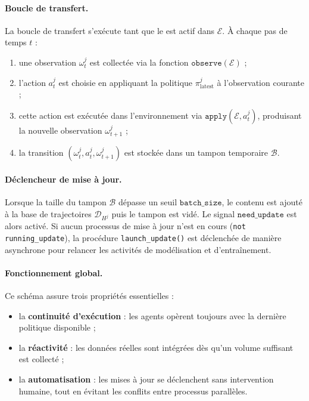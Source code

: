 \paragraph{Boucle de transfert.}
La boucle de transfert s'exécute tant que le  est actif dans $\mathcal{E}$.
À chaque pas de temps $t$ :
\begin{enumerate}
  \item une observation $\omega^j_t$ est collectée via la fonction $\texttt{observe}(\mathcal{E})$ ;
  \item l'action $a^j_t$ est choisie en appliquant la politique $\pi^j_{\text{latest}}$ à l'observation courante ;
  \item cette action est exécutée dans l'environnement via $\texttt{apply}(\mathcal{E}, a^j_t)$, produisant la nouvelle observation $\omega^j_{t+1}$ ;
  \item la transition $(\omega^j_t, a^j_t, \omega^j_{t+1})$ est stockée dans un tampon temporaire $\mathcal{B}$.
\end{enumerate}

\paragraph{Déclencheur de mise à jour.}
Lorsque la taille du tampon $\mathcal{B}$ dépasse un seuil $\texttt{batch\_size}$, le contenu est ajouté à la base de trajectoires $\mathcal{D}_{H^j}$ puis le tampon est vidé.
Le signal $\texttt{need\_update}$ est alors activé.
Si aucun processus de mise à jour n'est en cours (\texttt{not running\_update}), la procédure \texttt{launch\_update()} est déclenchée de manière asynchrone pour relancer les activités de modélisation et d'entraînement.

\paragraph{Fonctionnement global.}
Ce schéma assure trois propriétés essentielles :
\begin{itemize}
  \item la \textbf{continuité d'exécution} : les agents opèrent toujours avec la dernière politique disponible ;
  \item la \textbf{réactivité} : les données réelles sont intégrées dès qu'un volume suffisant est collecté ;
  \item la \textbf{automatisation} : les mises à jour se déclenchent sans intervention humaine, tout en évitant les conflits entre processus parallèles.
\end{itemize}

